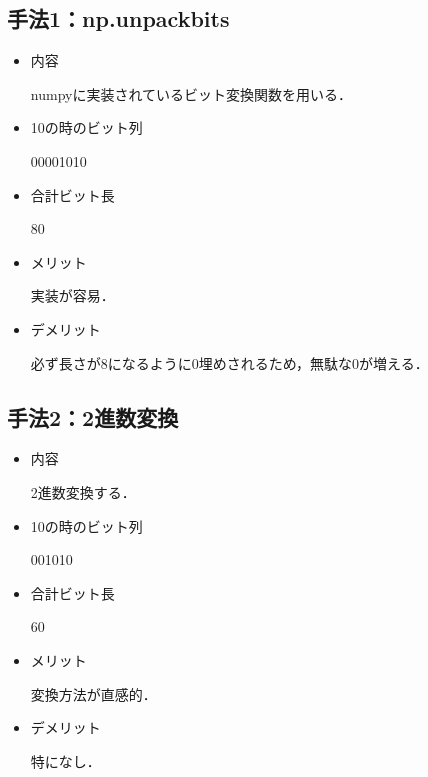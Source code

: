 \documentclass[main]{subfiles}
\begin{document}
        \subsection{手法1：np.unpackbits}
        \begin{itemize}
            \item 内容
            
                numpyに実装されているビット変換関数を用いる．
            \item 10の時のビット列
                
                00001010
            \item 合計ビット長
            
                80
            \item メリット
            
                実装が容易．
            \item デメリット
                
                必ず長さが8になるように0埋めされるため，無駄な0が増える．
            
        \end{itemize}
        \subsection{手法2：2進数変換}
        \begin{itemize}
            \item 内容
            
                2進数変換する．
            \item 10の時のビット列
                
                001010
            \item 合計ビット長
            
                60
            \item メリット
            
                変換方法が直感的．
            \item デメリット
                
                特になし．
            
        \end{itemize}
\end{document}
